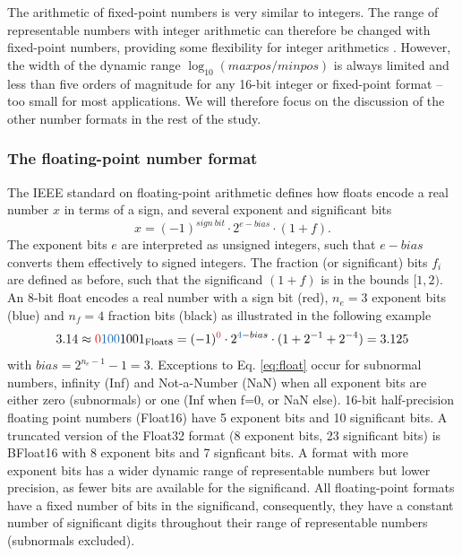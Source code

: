 \documentclass[draft]{agujournal2019}
\newcommand{\op}{\operatorname}
\begin{document}
The arithmetic of fixed-point numbers is very similar to integers. The range of
representable numbers with integer arithmetic can therefore be
changed with fixed-point numbers, providing some flexibility for integer arithmetics
\cite{Russell2017}. However, the width of the dynamic range $\log_{10}(maxpos/minpos)$
is always limited and less than five orders of magnitude for any 16-bit integer
or fixed-point format -- too small for most applications. We will therefore focus
on the discussion of the other number formats in the rest of the study.

\subsubsection{The floating-point number format}
\label{sec:floats}

The IEEE standard on floating-point arithmetic defines how floats encode a real
number $x$ in terms of a sign, and several exponent and significant bits
\begin{equation}
x = (-1)^{sign~bit} \cdot 2^{e-bias} \cdot (1+f).
\label{eq:float}
\end{equation}
The exponent bits $e$ are interpreted as unsigned integers, such that $e-bias$
converts them effectively to signed integers. The fraction (or significant) bits
$f_i$ are defined as before, such that the significand $(1+f)$ is in the bounds
$[1,2)$. An 8-bit float encodes a real number with a sign bit (red), $n_e = 3$
exponent bits (blue) and $n_f=4$ fraction bits (black) as illustrated in the
following example
\begin{equation}
3.14 \approx {\color{psign}0}{\color{pexpo}100}1001_{\op{Float8}} =
(-1)^{\color{psign}0} \cdot 2^{{\color{pexpo}4}-bias} \cdot (1+2^{-1}+2^{-4}) =
3.125
\label{eq:posit_pos}
\end{equation}
with $bias=2^{n_e-1} - 1 = 3$. Exceptions to Eq. \ref{eq:float} occur for
subnormal numbers, infinity (Inf) and Not-a-Number (NaN) when all exponent bits
are either zero (subnormals) or one (Inf when f=0, or NaN else). 16-bit half-precision
floating point numbers (Float16) have 5 exponent bits and 10 significant bits.
A truncated version of the Float32 format (8 exponent bits, 23 significant bits)
is BFloat16 with 8 exponent bits and 7 signficant bits. A format with more exponent
bits has a wider dynamic range of representable numbers but lower precision, as
fewer bits are available for the significand. All floating-point formats have a
fixed number of bits in the significand, consequently, they have a constant
number of significant digits throughout their range of representable numbers
(subnormals excluded).
\end{document}

